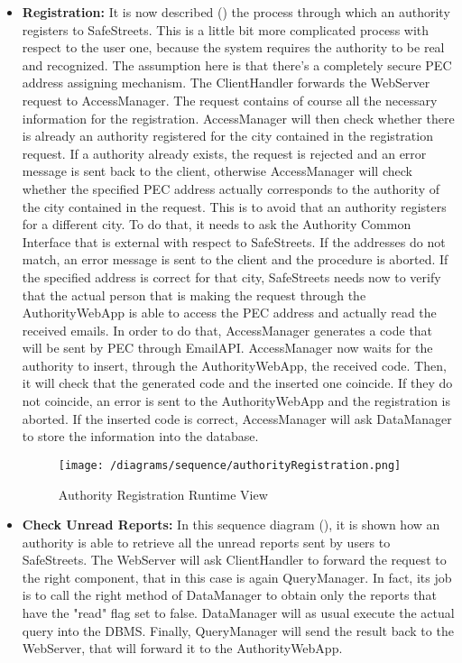 			\begin{itemize}
				\item \textbf{Registration:} It is now described () the process through which an authority registers to SafeStreets. This is a little bit more complicated process with respect to the user one, because the system requires the authority to be real and recognized. The assumption here is that there's a completely secure PEC address assigning mechanism. The ClientHandler forwards the WebServer request to AccessManager. The request contains of course all the necessary information for the registration. AccessManager will then check whether there is already an authority registered for the city contained in the registration request. If a authority already exists, the request is rejected and an error message is sent back to the client, otherwise AccessManager will check whether the specified PEC address actually corresponds to the authority of the city contained in the request. This is to avoid that an authority registers for a different city. To do that, it needs to ask the Authority Common Interface that is external with respect to SafeStreets. If the addresses do not match, an error message is sent to the client and the procedure is aborted. If the specified address is correct for that city, SafeStreets needs now to verify that the actual person that is making the request through the AuthorityWebApp is able to access the PEC address and actually read the received emails. In order to do that, AccessManager generates a code that will be sent by PEC through EmailAPI. AccessManager now waits for the authority to insert, through the AuthorityWebApp, the received code. Then, it will check that the generated code and the inserted one coincide. If they do not coincide, an error is sent to the AuthorityWebApp and the registration is aborted. If the inserted code is correct, AccessManager will ask DataManager to store the information into the database.
				
				\begin{figure}[h!]
					\centering
					\texttt{[image: /diagrams/sequence/authorityRegistration.png]}
					\caption{\label{fig:authorityRegistrationRuntime} Authority Registration Runtime View}
				\end{figure}
			
				\item \textbf{Check Unread Reports:} In this sequence diagram (), it is shown how an authority is able to retrieve all the unread reports sent by users to SafeStreets. The WebServer will ask ClientHandler to forward the request to the right component, that in this case is again QueryManager. In fact, its job is to call the right method of DataManager to obtain only the reports that have the "read" flag set to false. DataManager will as usual execute the actual query into the DBMS. Finally, QueryManager will send the result back to the WebServer, that will forward it to the AuthorityWebApp.
				

\end{itemize}
